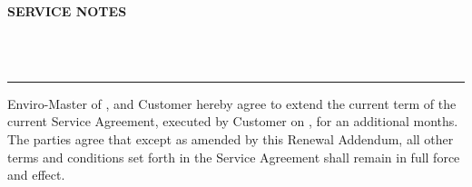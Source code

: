 \documentclass[10pt]{article}
\begin{document}

\vspace{1.0em}

\noindent\textbf{\textcolor{emred}{SERVICE NOTES}}

\vspace{0.25em}

\noindent\hrulefill\\[0.3em]
\noindent\hrulefill\\[0.3em]
\noindent\hrulefill


\vspace{0.5em}
\noindent\textcolor{emred}{\rule{0.98\textwidth}{0.6pt}}

\vspace{0.4em}

{\scriptsize
\noindent Enviro-Master of \underline{\hspace{2.5cm}}, and Customer hereby agree to extend the current term of
the current Service Agreement, executed by Customer on \underline{\hspace{2cm}}, for an additional
\underline{\hspace{1.2cm}} months. The parties agree that except as amended by this Renewal Addendum, all other
terms and conditions set forth in the Service Agreement shall remain in full force and effect.
}


\vspace{0.6em}
\end{document}
